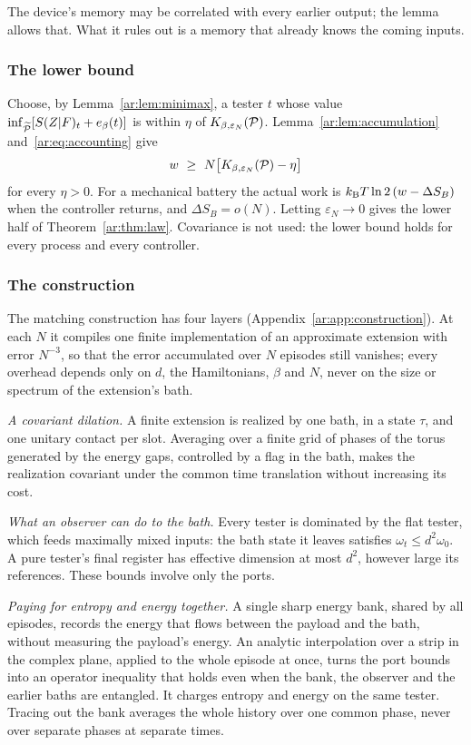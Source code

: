 The device's memory may be correlated with every earlier output; the lemma allows that. What it rules out is a memory that already knows the coming inputs.

\subsubsection{The lower bound}

Choose, by Lemma~\ref{ar:lem:minimax}, a tester $t$ whose value $\inf_{\widetilde{\mathcal P}}[S(Z|F)_t+e_\beta(t)]$ is within $\eta$ of $K_{\beta,\varepsilon_N}(\mathcal P)$. Lemma~\ref{ar:lem:accumulation} and~\eqref{ar:eq:accounting} give
\begin{equation}\label{ar:eq:converse}
w\ \ge\ N\bigl[K_{\beta,\varepsilon_N}(\mathcal P)-\eta\bigr]
\end{equation}
for every $\eta>0$. For a mechanical battery the actual work is $k_{\mathrm B} T\ln2\,(w-\Delta S_B)$ when the controller returns, and $\Delta S_B=o(N)$. Letting $\varepsilon_N\to0$ gives the lower half of Theorem~\ref{ar:thm:law}. Covariance is not used: the lower bound holds for every process and every controller.

\subsubsection{The construction}\label{ar:sec:construction}

The matching construction has four layers (Appendix~\ref{ar:app:construction}). At each $N$ it compiles one finite implementation of an approximate extension with error $N^{-3}$, so that the error accumulated over $N$ episodes still vanishes; every overhead depends only on $d$, the Hamiltonians, $\beta$ and $N$, never on the size or spectrum of the extension's bath.

\emph{A covariant dilation.} A finite extension is realized by one bath, in a state $\tau$, and one unitary contact per slot. Averaging over a finite grid of phases of the torus generated by the energy gaps, controlled by a flag in the bath, makes the realization covariant under the common time translation without increasing its cost.

\emph{What an observer can do to the bath.} Every tester is dominated by the flat tester, which feeds maximally mixed inputs: the bath state it leaves satisfies $\omega_t\le d^2\omega_0$. A pure tester's final register has effective dimension at most $d^2$, however large its references. These bounds involve only the ports.

\emph{Paying for entropy and energy together.} A single sharp energy bank, shared by all episodes, records the energy that flows between the payload and the bath, without measuring the payload's energy. An analytic interpolation over a strip in the complex plane, applied to the whole episode at once, turns the port bounds into an operator inequality that holds even when the bank, the observer and the earlier baths are entangled. It charges entropy and energy on the same tester. Tracing out the bank averages the whole history over one common phase, never over separate phases at separate times.


